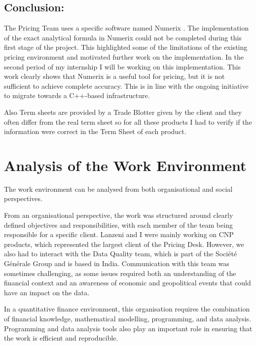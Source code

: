 \documentclass{article}
\begin{document}
\subsection{Conclusion:}

The Pricing Team uses a specific software named Numerix \cite{Numerix}. The implementation of the exact analytical formula in Numerix could not be completed during this first stage of the project. This highlighted some of the limitations of the existing pricing environment and motivated further work on the implementation. In the second period of my internship I will be working on this implementation. This work clearly shows that Numerix is a useful tool for pricing, but it is not sufficient to achieve complete accuracy. This is in line with the ongoing initiative to migrate towards a C++-based infrastructure.

Also Term sheets are provided by a Trade Blotter given by the client and they often differ from the real term sheet so for all these products I had to verify if the information were correct in the Term Sheet of each product.

\clearpage

\section{Analysis of the Work Environment}

The work environment can be analysed from both organisational and social perspectives.

From an organisational perspective, the work was structured around clearly defined objectives and responsibilities, with each member of the team being responsible for a specific client. Lanzeni and I were mainly working on CNP products, which represented the largest client of the Pricing Desk. However, we also had to interact with the Data Quality team, which is part of the Société Générale Group and is based in India. Communication with this team was sometimes challenging, as some issues required both an understanding of the financial context and an awareness of economic and geopolitical events that could have an impact on the data.

In a quantitative finance environment, this organisation requires the combination of financial knowledge, mathematical modelling, programming, and data analysis. Programming and data analysis tools also play an important role in ensuring that the work is efficient and reproducible.
\end{document}
